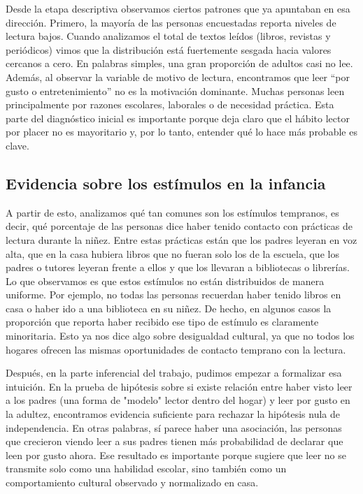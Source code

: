 \documentclass[aps,reprint]{revtex4-2}
\begin{document}
Desde la etapa descriptiva observamos ciertos patrones que ya apuntaban en esa dirección. Primero, la mayoría de las personas encuestadas reporta niveles de lectura bajos. Cuando analizamos el total de textos leídos (libros, revistas y periódicos) vimos que la distribución está fuertemente sesgada hacia valores cercanos a cero. En palabras simples, una gran proporción de adultos casi no lee. Además, al observar la variable de motivo de lectura, encontramos que leer “por gusto o entretenimiento” no es la motivación dominante. Muchas personas leen principalmente por razones escolares, laborales o de necesidad práctica. Esta parte del diagnóstico inicial es importante porque deja claro que el hábito lector por placer no es mayoritario y, por lo tanto, entender qué lo hace más probable es clave.

\subsection*{Evidencia sobre los estímulos en la infancia}

A partir de esto, analizamos qué tan comunes son los estímulos tempranos, es decir, qué porcentaje de las personas dice haber tenido contacto con prácticas de lectura durante la niñez. Entre estas prácticas están que los padres leyeran en voz alta, que en la casa hubiera libros que no fueran solo los de la escuela, que los padres o tutores leyeran frente a ellos y que los llevaran a bibliotecas o librerías. Lo que observamos es que estos estímulos no están distribuidos de manera uniforme. Por ejemplo, no todas las personas recuerdan haber tenido libros en casa o haber ido a una biblioteca en su niñez. De hecho, en algunos casos la proporción que reporta haber recibido ese tipo de estímulo es claramente minoritaria. Esto ya nos dice algo sobre desigualdad cultural, ya que no todos los hogares ofrecen las mismas oportunidades de contacto temprano con la lectura.

Después, en la parte inferencial del trabajo, pudimos empezar a formalizar esa intuición. En la prueba de hipótesis sobre si existe relación entre haber visto leer a los padres (una forma de "modelo" lector dentro del hogar) y leer por gusto en la adultez, encontramos evidencia suficiente para rechazar la hipótesis nula de independencia. En otras palabras, sí parece haber una asociación, las personas que crecieron viendo leer a sus padres tienen más probabilidad de declarar que leen por gusto ahora. Ese resultado es importante porque sugiere que leer no se transmite solo como una habilidad escolar, sino también como un comportamiento cultural observado y normalizado en casa.
\end{document}
